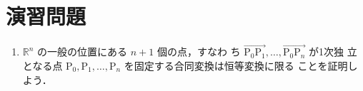 \documentclass[11pt, uplatex, dvipdfmx, titlepage]{jsarticle}
\makeatletter
\renewcommand{\bar}[1]{\overline{#1}}
\renewenvironment{proof}[1][\proofname]{\par
  \pushQED{\qed}%
  \normalfont \topsep6\p@\@plus6\p@\relax
  \trivlist
  \item[\hskip\labelsep
         \bfseries
    {#1}]\ignorespaces
}{%
  \popQED\endtrivlist\@endpefalse
}
\theoremstyle{definition}
\renewcommand{\proofname}{\textbf{証明}}
\makeatother
\begin{document}
\section*{演習問題}

\begin{enumerate}
  \setlength{\itemsep}{1zh}

\item $\mathbb{R}^n$ の一般の位置にある $n+1$ 個の点，すなわ
  ち $\overrightarrow{\mathrm{P}_0\mathrm{P}_1}, \ldots, \overrightarrow{\mathrm{P}_0\mathrm{P}_n}$ が1次独
  立となる点 $\mathrm{P}_0, \mathrm{P}_1, \ldots, \mathrm{P}_n$ を固定する合同変換は恒等変換に限る
  ことを証明しよう．



    
    
    
    
    

\end{enumerate}
\end{document}
